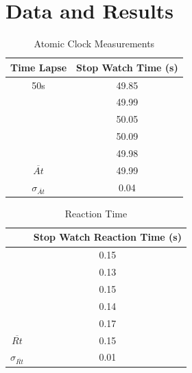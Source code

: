\documentclass[iop]{emulateapj}
\begin{document}
\section{Data and Results}
\label{sec:data}




\begin{table}[H]
\caption{Atomic Clock Measurements} %
\centering %
\begin{tabular}{c c} %
\hline\hline %
Time Lapse & Stop Watch Time (s) \\ [0.5ex] %
\hline %
50s & 49.85 \\ %
    & 49.99 \\
    & 50.05 \\
    & 50.09 \\
    & 49.98 \\
$\overline{At}$ & 49.99 \\
$\sigma_{\overline{At}}$ & 0.04 \\    [1ex] %
\hline %
\end{tabular}
\label{table:nonlin} %
\end{table}


\begin{table}[H]
\caption{Reaction Time} %
\centering %
\begin{tabular}{c c} %
\hline\hline %
& Stop Watch Reaction Time (s) \\ [0.5ex] %
\hline %
& 0.15 \\ %
& 0.13\\
& 0.15\\
& 0.14\\
& 0.17\\
$\overline{Rt}$ & 0.15 \\
$\sigma_{\overline{Rt}}$ & 0.01 \\    [1ex] %
\hline %
\end{tabular}
\label{table:nonlin} %
\end{table}
\end{document}
